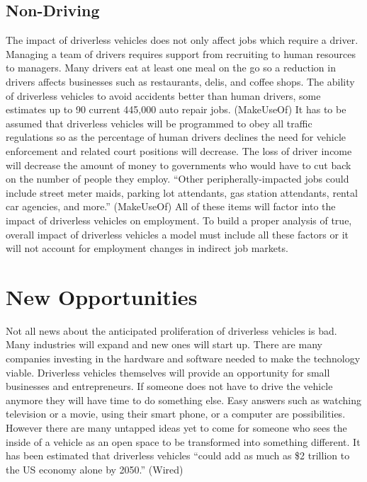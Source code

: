 \documentclass[sigconf]{acmart}
\begin{document}
\subsection{Non-Driving}

The impact of driverless vehicles does not only affect jobs which require a 
driver.  Managing a team of drivers requires support from recruiting to human 
resources to managers.  Many drivers eat at least one meal on the go so a 
reduction in drivers affects businesses such as restaurants, delis, and coffee 
shops.  The ability of driverless vehicles to avoid accidents better than human 
drivers, some estimates up to 90%
current 445,000 auto repair jobs. (MakeUseOf)  It has to be assumed that 
driverless vehicles will be programmed to obey all traffic regulations so as 
the percentage of human drivers declines the need for vehicle enforcement and 
related court positions will decrease.  The loss of driver income will decrease 
the amount of money to governments who would have to cut back on the number of 
people they employ.  ``Other peripherally-impacted jobs could include street 
meter maids, parking lot attendants, gas station attendants, rental car 
agencies, and more.'' (MakeUseOf)   All of these items will factor into the 
impact of driverless vehicles on employment.  To build a proper analysis of 
true, overall impact of driverless vehicles a model must include all these 
factors or it will not account for employment changes in indirect job markets.

\section{New Opportunities}

Not all news about the anticipated proliferation of driverless vehicles is bad.  
Many industries will expand and new ones will start up.  There are many 
companies investing in the hardware and software needed to make the technology 
viable.  Driverless vehicles themselves will provide an opportunity for small 
businesses and entrepreneurs.  If someone does not have to drive the vehicle 
anymore they will have time to do something else.  Easy answers such as 
watching television or a movie, using their smart phone, or a computer are 
possibilities.  However there are many untapped ideas yet to come for someone 
who sees the inside of a vehicle as an open space to be transformed into 
something different.  It has been estimated that driverless vehicles ``could 
add as much as \$2 trillion to the US economy alone by 2050.'' (Wired) 
\end{document}
